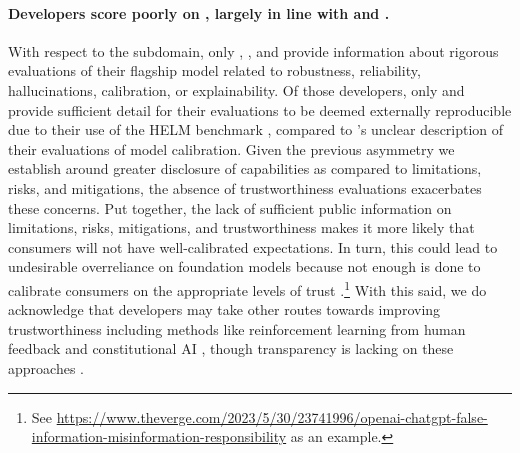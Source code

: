 \paragraph{Developers score poorly on \trustworthiness, largely in line with \risks and \modelmitigations.}
With respect to the \trustworthiness subdomain, only \openai, \cohere, and \aitwentyone provide information about rigorous evaluations of their flagship model related to robustness, reliability, hallucinations, calibration, or explainability.
Of those developers, only \cohere and \aitwentyone provide sufficient detail for their evaluations to be deemed externally reproducible due to their use of the HELM benchmark \citep{liang2023holistic}, compared to \openai's unclear description of their evaluations of model calibration.
Given the previous asymmetry we establish around greater disclosure of capabilities as compared to limitations, risks, and mitigations, the absence of trustworthiness evaluations exacerbates these concerns.
Put together, the lack of sufficient public information on limitations, risks, mitigations, and trustworthiness makes it more likely that consumers will not have well-calibrated expectations.
In turn, this could lead to undesirable overreliance on foundation models because not enough is done to calibrate consumers on the appropriate levels of trust \citep{parasuraman2010complacency}.\footnote{See \url{https://www.theverge.com/2023/5/30/23741996/openai-chatgpt-false-information-misinformation-responsibility} as an example.}
With this said, we do acknowledge that developers may take other routes towards improving trustworthiness including methods like reinforcement learning from human feedback \citep[RLHF;]{ziegler2019finetuning, ouyang2022instructions} and constitutional AI \citep{bai2022constitutional}, though transparency is lacking on these approaches \citep{casper2023open}.

